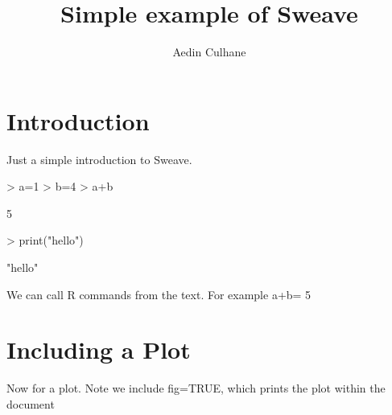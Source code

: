 \documentclass{article}
\begin{document}


\title{Simple example of Sweave}
\author{Aedin Culhane}





\maketitle
\tableofcontents


\section{Introduction}

Just a simple introduction to Sweave. 

\begin{Schunk}
\begin{Sinput}
> a=1
> b=4
> a+b
\end{Sinput}
\begin{Soutput}
[1] 5
\end{Soutput}
\begin{Sinput}
> print("hello")
\end{Sinput}
\begin{Soutput}
[1] "hello"
\end{Soutput}
\end{Schunk}

We can call R commands from the text. For example a+b= 5

\section{Including a Plot}
Now for a plot.  Note we include fig=TRUE, which prints the plot within the document
\end{document}
